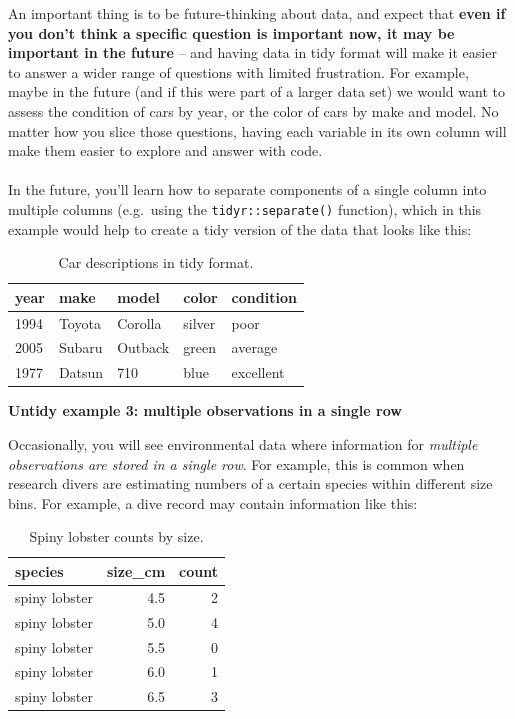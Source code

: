 \documentclass[
]{book}
\begin{document}
An important thing is to be future-thinking about data, and expect that \textbf{even if you don't think a specific question is important now, it may be important in the future} -- and having data in tidy format will make it easier to answer a wider range of questions with limited frustration. For example, maybe in the future (and if this were part of a larger data set) we would want to assess the condition of cars by year, or the color of cars by make and model. No matter how you slice those questions, having each variable in its own column will make them easier to explore and answer with code.\\
~\\
In the future, you'll learn how to separate components of a single column into multiple columns (e.g.~using the \texttt{tidyr::separate()} function), which in this example would help to create a tidy version of the data that looks like this:\\

\begin{table}

\caption{\label{tab:unnamed-chunk-10}Car descriptions in tidy format.}
\centering
\begin{tabular}[t]{l|l|l|l|l}
\hline
year & make & model & color & condition\\
\hline
1994 & Toyota & Corolla & silver & poor\\
\hline
2005 & Subaru & Outback & green & average\\
\hline
1977 & Datsun & 710 & blue & excellent\\
\hline
\end{tabular}
\end{table}

\textbf{Untidy example 3: multiple observations in a single row}

Occasionally, you will see environmental data where information for \emph{multiple observations are stored in a single row}. For example, this is common when research divers are estimating numbers of a certain species within different size bins. For example, a dive record may contain information like this:

\begin{table}

\caption{\label{tab:unnamed-chunk-11}Spiny lobster counts by size.}
\centering
\begin{tabular}[t]{l|r|r}
\hline
species & size\_cm & count\\
\hline
spiny lobster & 4.5 & 2\\
\hline
spiny lobster & 5.0 & 4\\
\hline
spiny lobster & 5.5 & 0\\
\hline
spiny lobster & 6.0 & 1\\
\hline
spiny lobster & 6.5 & 3\\
\hline
\end{tabular}
\end{table}
\end{document}
